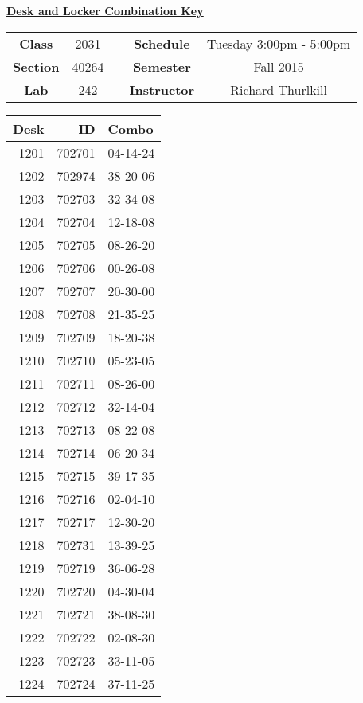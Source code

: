 \documentclass[12pt]{article}
\begin{document}
\thispagestyle{empty}

\begin{center}
	{\huge\textbf{\underline{ Desk and Locker Combination Key}}}
\end{center}


\begin{table}[h]
  \centering
  \begin{tabular}{ccccc}

  \textbf{Class} & 2031 & {\qquad} &\textbf{Schedule} & Tuesday 3:00pm - 5:00pm \\
  \textbf{Section} & 40264 & {\qquad} & \textbf{Semester} & Fall 2015 \\
  \textbf{Lab} & 242 & {\qquad} & \textbf{Instructor} & Richard Thurlkill \\
  \end{tabular}
\end{table}
 \vspace{0.1in}
\begin{minipage}{0.4\textwidth}

\begin{tabular}{rrl}
\toprule
 Desk &      ID &     Combo \\
\midrule
 1201 &  702701 &  04-14-24 \\
 1202 &  702974 &  38-20-06 \\
 1203 &  702703 &  32-34-08 \\
 1204 &  702704 &  12-18-08 \\
 1205 &  702705 &  08-26-20 \\
 1206 &  702706 &  00-26-08 \\
 1207 &  702707 &  20-30-00 \\
 1208 &  702708 &  21-35-25 \\
 1209 &  702709 &  18-20-38 \\
 1210 &  702710 &  05-23-05 \\
 1211 &  702711 &  08-26-00 \\
 1212 &  702712 &  32-14-04 \\
 1213 &  702713 &  08-22-08 \\
 1214 &  702714 &  06-20-34 \\
 1215 &  702715 &  39-17-35 \\
 1216 &  702716 &  02-04-10 \\
 1217 &  702717 &  12-30-20 \\
 1218 &  702731 &  13-39-25 \\
 1219 &  702719 &  36-06-28 \\
 1220 &  702720 &  04-30-04 \\
 1221 &  702721 &  38-08-30 \\
 1222 &  702722 &  02-08-30 \\
 1223 &  702723 &  33-11-05 \\
 1224 &  702724 &  37-11-25 \\
\bottomrule
\end{tabular}


\end{minipage}
\end{document}
